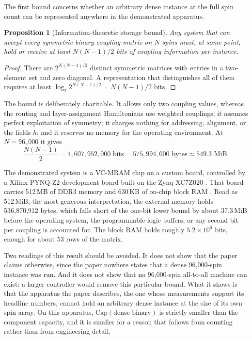 \documentclass[11pt]{article}
\newtheorem{proposition}{Proposition}
\theoremstyle{definition}
\theoremstyle{remark}
\begin{document}
The first bound concerns whether an arbitrary dense instance at the full spin count can be represented anywhere in the demonstrated apparatus.

\begin{proposition}[Information-theoretic storage bound]\label{prop:storage}
Any system that can accept every symmetric binary coupling matrix on $N$ spins must, at some point, hold or receive at least $N(N-1)/2$ bits of coupling information per instance.
\end{proposition}

\begin{proof}
There are $2^{N(N-1)/2}$ distinct symmetric matrices with entries in a two-element set and zero diagonal. A representation that distinguishes all of them requires at least $\log_2 2^{N(N-1)/2} = N(N-1)/2$ bits.
\end{proof}

The bound is deliberately charitable. It allows only two coupling values, whereas the routing and layer-assignment Hamiltonians use weighted couplings; it assumes perfect exploitation of symmetry; it charges nothing for addressing, alignment, or the fields $h$; and it reserves no memory for the operating environment. At $N = 96{,}000$ it gives
\begin{equation}
\frac{N(N-1)}{2} = 4{,}607{,}952{,}000 \text{ bits} = 575{,}994{,}000 \text{ bytes} \approx 549.3 \text{ MiB}.
\end{equation}

The demonstrated system is a VC-MRAM chip on a custom board, controlled by a Xilinx PYNQ-Z2 development board built on the Zynq XC7Z020 \cite{li2026}. That board carries 512\,MB of DDR3 memory and 630\,KB of on-chip block RAM \cite{pynq,tul}. Read as 512\,MiB, the most generous interpretation, the external memory holds 536,870,912 bytes, which falls short of the one-bit lower bound by about 37.3\,MiB before the operating system, the programmable-logic buffers, or any second bit per coupling is accounted for. The block RAM holds roughly $5.2 \times 10^6$ bits, enough for about 53 rows of the matrix.

Two readings of this result should be avoided. It does not show that the paper claims otherwise, since the paper nowhere states that a dense 96,000-spin instance was run. And it does not show that no 96,000-spin all-to-all machine can exist: a larger controller would remove this particular bound. What it shows is that the apparatus the paper describes, the one whose measurements support its headline numbers, cannot hold an arbitrary dense instance at the size of its own spin array. On this apparatus, $\mathrm{Cap}(\text{dense binary})$ is strictly smaller than the component capacity, and it is smaller for a reason that follows from counting rather than from engineering detail.
\end{document}
